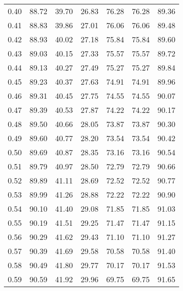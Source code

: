 \begin{tabular}{|c|c|c|c|c|c|c|}
      0.40 &     88.72 &     39.70 &      26.83 &   76.28 &      76.28 &         89.36 \\
      0.41 &     88.83 &     39.86 &      27.01 &   76.06 &      76.06 &         89.48 \\
      0.42 &     88.93 &     40.02 &      27.18 &   75.84 &      75.84 &         89.60 \\
      0.43 &     89.03 &     40.15 &      27.33 &   75.57 &      75.57 &         89.72 \\
      0.44 &     89.13 &     40.27 &      27.49 &   75.27 &      75.27 &         89.84 \\
      0.45 &     89.23 &     40.37 &      27.63 &   74.91 &      74.91 &         89.96 \\
      0.46 &     89.31 &     40.45 &      27.75 &   74.55 &      74.55 &         90.07 \\
      0.47 &     89.39 &     40.53 &      27.87 &   74.22 &      74.22 &         90.17 \\
      0.48 &     89.50 &     40.66 &      28.05 &   73.87 &      73.87 &         90.30 \\
      0.49 &     89.60 &     40.77 &      28.20 &   73.54 &      73.54 &         90.42 \\
      0.50 &     89.69 &     40.87 &      28.35 &   73.16 &      73.16 &         90.54 \\
      0.51 &     89.79 &     40.97 &      28.50 &   72.79 &      72.79 &         90.66 \\
      0.52 &     89.89 &     41.11 &      28.69 &   72.52 &      72.52 &         90.77 \\
      0.53 &     89.99 &     41.26 &      28.88 &   72.22 &      72.22 &         90.90 \\
      0.54 &     90.10 &     41.40 &      29.08 &   71.85 &      71.85 &         91.03 \\
      0.55 &     90.19 &     41.51 &      29.25 &   71.47 &      71.47 &         91.15 \\
      0.56 &     90.29 &     41.62 &      29.43 &   71.10 &      71.10 &         91.27 \\
      0.57 &     90.39 &     41.69 &      29.58 &   70.58 &      70.58 &         91.40 \\
      0.58 &     90.49 &     41.80 &      29.77 &   70.17 &      70.17 &         91.53 \\
      0.59 &     90.59 &     41.92 &      29.96 &   69.75 &      69.75 &         91.65 \\

\end{tabular}
